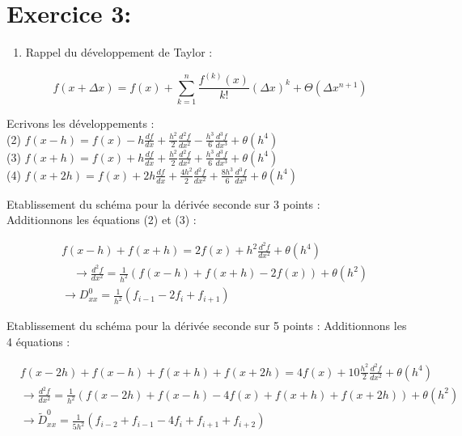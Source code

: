 \documentclass[10pt]{article}
\begin{document}
\section*{Exercice 3:}
\begin{enumerate}
  \item Rappel du développement de Taylor :
\end{enumerate}

\[
f(x+\Delta x)=f(x)+\sum_{k=1}^{n} \frac{f^{(k)}(x)}{k!}(\Delta x)^{k}+\Theta\left(\Delta x^{n+1}\right)
\]

Ecrivons les développements :\\
(2) \(f(x-h)=f(x)-h \frac{d f}{d x}+\frac{h^{2}}{2} \frac{d^{2} f}{d x^{2}}-\frac{h^{3}}{6} \frac{d^{3} f}{d x^{3}}+\theta\left(h^{4}\right)\)\\
(3) \(f(x+h)=f(x)+h \frac{d f}{d x}+\frac{h^{2}}{2} \frac{d^{2} f}{d x^{2}}+\frac{h^{3}}{6} \frac{d^{3} f}{d x^{3}}+\theta\left(h^{4}\right)\)\\
(4) \(f(x+2 h)=f(x)+2 h \frac{d f}{d x}+\frac{4 h^{2}}{2} \frac{d^{2} f}{d x^{2}}+\frac{8 h^{3}}{6} \frac{d^{3} f}{d x^{3}}+\theta\left(h^{4}\right)\)

Etablissement du schéma pour la dérivée seconde sur 3 points :\\
Additionnons les équations (2) et (3) :

\[
\begin{aligned}
& f(x-h)+f(x+h)=2 f(x)+h^{2} \frac{d^{2} f}{d x^{2}}+\theta\left(h^{4}\right) \\
& \quad \rightarrow \frac{d^{2} f}{d x^{2}}=\frac{1}{h^{2}}(f(x-h)+f(x+h)-2 f(x))+\theta\left(h^{2}\right) \\
& \rightarrow D_{x x}^{0}=\frac{1}{h^{2}}\left(f_{i-1}-2 f_{i}+f_{i+1}\right)
\end{aligned}
\]

Etablissement du schéma pour la dérivée seconde sur 5 points : Additionnons les 4 équations :

\[
\begin{aligned}
& f(x-2 h)+f(x-h)+f(x+h)+f(x+2 h)=4 f(x)+10 \frac{h^{2}}{2} \frac{d^{2} f}{d x^{2}}+\theta\left(h^{4}\right) \\
& \rightarrow \frac{d^{2} f}{d x^{2}}=\frac{1}{h^{2}}(f(x-2 h)+f(x-h)-4 f(x)+f(x+h)+f(x+2 h))+\theta\left(h^{2}\right) \\
& \rightarrow \widetilde{D}_{x x}^{0}=\frac{1}{5 h^{2}}\left(f_{i-2}+f_{i-1}-4 f_{i}+f_{i+1}+f_{i+2}\right)
\end{aligned}
\]
\end{document}
